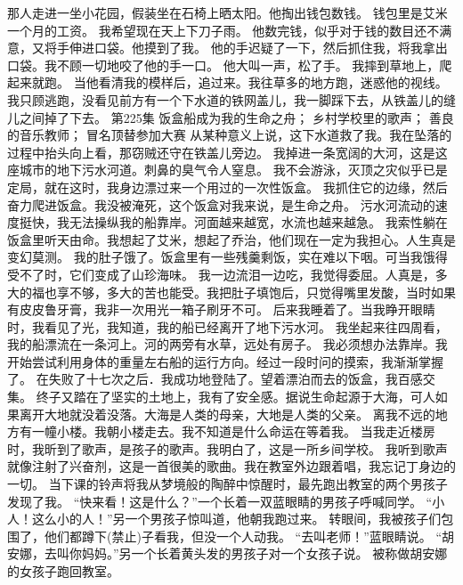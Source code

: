 \documentclass[a4paper,12pt,UTF8,twoside]{ctexbook}
\begin{document}
        那人走进一坐小花园，假装坐在石椅上晒太阳。他掏出钱包数钱。 
        钱包里是艾米一个月的工资。 
        我希望现在天上下刀子雨。 
        他数完钱，似乎对于钱的数目还不满意，又将手伸进口袋。他摸到了我。 
        他的手迟疑了一下，然后抓住我，将我拿出口袋。我不顾一切地咬了他的手一口。 
        他大叫一声，松了手。 
        我摔到草地上，爬起来就跑。 
        当他看清我的模样后，追过来。我往草多的地方跑，迷惑他的视线。 
        我只顾逃跑，没看见前方有一个下水道的铁网盖儿，我一脚踩下去，从铁盖儿的缝儿之间掉了下去。   第225集 
        饭盒船成为我的生命之舟； 
        乡村学校里的歌声； 
        善良的音乐教师； 
        冒名顶替参加大赛   
        从某种意义上说，这下水道救了我。我在坠落的过程中抬头向上看，那窃贼还守在铁盖儿旁边。 
        我掉进一条宽阔的大河，这是这座城市的地下污水河道。刺鼻的臭气令人窒息。 
        我不会游泳，灭顶之灾似乎已是定局，就在这时，我身边漂过来一个用过的一次性饭盒。 
        我抓住它的边缘，然后奋力爬进饭盒。我没被淹死，这个饭盒对我来说，是生命之舟。 
        污水河流动的速度挺快，我无法操纵我的船靠岸。河面越来越宽，水流也越来越急。 
        我索性躺在饭盒里听天由命。我想起了艾米，想起了乔治，他们现在一定为我担心。人生真是变幻莫测。 
        我的肚子饿了。饭盒里有一些残羹剩饭，实在难以下咽。可当我饿得受不了时，它们变成了山珍海味。 
        我一边流泪一边吃，我觉得委屈。人真是，多大的福也享不够，多大的苦也能受。我把肚子填饱后，只觉得嘴里发酸，当时如果有皮皮鲁牙膏，我非一次用光一箱子刷牙不可。 
        后来我睡着了。当我睁开眼睛时，我看见了光，我知道，我的船已经离开了地下污水河。 
        我坐起来往四周看，我的船漂流在一条河上。河的两旁有水草，远处有房子。 
        我必须想办法靠岸。我开始尝试利用身体的重量左右船的运行方向。经过一段时问的摸索，我渐渐掌握了。 
        在失败了十七次之后．我成功地登陆了。望着漂泊而去的饭盒，我百感交集。 
        终子又踏在了坚实的土地上，我有了安全感。据说生命起源于大海，可人如果离开大地就没着没落。大海是人类的母亲，大地是人类的父亲。 
        离我不远的地方有一幢小楼。我朝小楼走去。我不知道是什么命运在等着我。 
        当我走近楼房时，我昕到了歌声，是孩子的歌声。我明白了，这是一所乡间学校。 
        我听到歌声就像注射了兴奋剂，这是一首很美的歌曲。我在教室外边跟着唱，我忘记丁身边的一切。 
        当下课的铃声将我从梦境般的陶醉中惊醒时，最先跑出教室的两个男孩子发现了我。 
        “快来看！这是什么？”一个长着一双蓝眼睛的男孩子呼喊同学。 
        “小人！这么小的人！”另一个男孩子惊叫道，他朝我跑过来。 
        转眼间，我被孩子们包围了，他们都蹲下(禁止)子看我，但没一个人动我。 
        “去叫老师！”蓝眼睛说。 
        “胡安娜，去叫你妈妈。”另一个长着黄头发的男孩子对一个女孩子说。 
        被称做胡安娜的女孩子跑回教室。 
\end{document}
